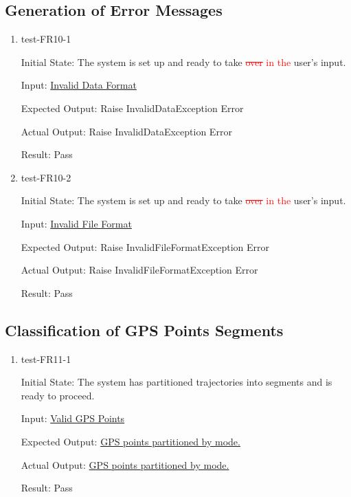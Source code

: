 \documentclass[12pt, titlepage]{article}
\begin{document}
\subsection{Generation of Error Messages}
\begin{enumerate}
    \item test-FR10-1\label{test-FR10-1}
    
    Initial State: The system is set up and ready to take \textcolor{red}{\sout{over} in} \textcolor{red}{the} user’s input.
    
    Input: \href{https://github.com/paezha/PyERT-BLACK/blob/rev0-test/quarto-example/data/sample-gps/sample-gps-4.csv}{Invalid Data Format}
    
    Expected Output: Raise InvalidDataException Error
    
    Actual Output: Raise InvalidDataException Error
    
    Result: Pass
    \item test-FR10-2\label{test-FR10-2}
    
    Initial State: The system is set up and ready to take \textcolor{red}{\sout{over} in} \textcolor{red}{the} user’s input.
    
    Input: \href{https://github.com/paezha/PyERT-BLACK/blob/rev0-test/quarto-example/data/sample-gps/sample-gps-1.gpx}{Invalid File Format}
    
    Expected Output: Raise InvalidFileFormatException Error
    
    Actual Output: Raise InvalidFileFormatException Error
    
    Result: Pass
\end{enumerate}

\subsection{Classification of GPS Points Segments}
\begin{enumerate}
    \item test-FR11-1\label{test-FR11-1}
    
    Initial State: The system has partitioned trajectories into segments and is ready to proceed.
    
    Input: \href{https://github.com/paezha/PyERT-BLACK/blob/rev0-test/quarto-example/data/sample-gps/sample-gps-1.csv}{Valid GPS Points}
    
    Expected Output: \href{https://github.com/paezha/PyERT-BLACK/blob/rev0-test/test/test_data/fr-tests/fr11-1-expected.csv}{GPS points partitioned by mode.}
    
    Actual Output: \href{https://github.com/paezha/PyERT-BLACK/blob/rev0-test/test/test_data/fr-tests/fr11-1-out.csv}{GPS points partitioned by mode.}
    
    Result: Pass
\end{enumerate}
\end{document}
